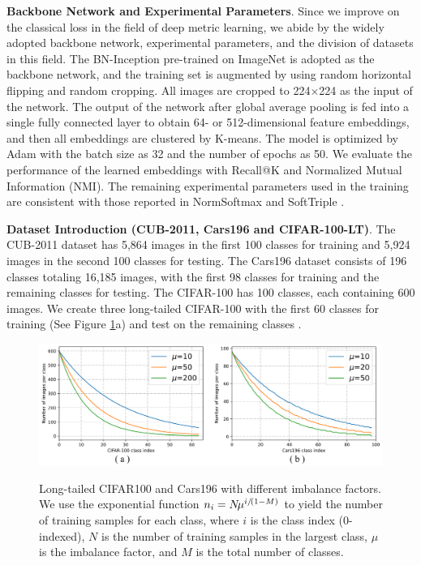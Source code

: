 \documentclass[10pt]{article} %
\begin{document}
\textbf{Backbone Network and Experimental Parameters}. Since we improve on the classical loss in the field of deep metric learning, we abide by the widely adopted backbone network, experimental parameters, and the division of datasets in this field. The BN-Inception \cite{paper38,paper78} pre-trained on ImageNet is adopted as the backbone network, and the training set is augmented by using random horizontal flipping and random cropping. All images are cropped to 224$\times$224 as the input of the network. The output of the network after global average pooling is fed into a single fully connected layer to obtain 64- or 512-dimensional feature embeddings, and then all embeddings are clustered by K-means. The model is optimized by Adam with the batch size as 32 and the number of epochs as 50. We evaluate the performance of the learned embeddings with Recall@K and Normalized Mutual Information (NMI). The remaining experimental parameters used in the training are consistent with those reported in NormSoftmax and SoftTriple \cite{paper82}.



\textbf{Dataset Introduction (CUB-2011, Cars196 and CIFAR-100-LT)}. The CUB-2011 dataset has 5,864 images in the first 100 classes for training and 5,924 images in the second 100 classes for testing. The Cars196 dataset consists of 196 classes totaling 16,185 images, with the first 98 classes for training and the remaining classes for testing. The CIFAR-100 has 100 classes, each containing 600 images. We create three long-tailed CIFAR-100 with the first 60 classes for training (See Figure \ref{fig6}a) and test on the remaining classes \cite{paper82}. 


\begin{figure}[h] %
\begin{center}
\includegraphics[width=0.95\columnwidth]{fig6}
\vskip -0.05in
\caption{Long-tailed CIFAR100 and Cars196 with different imbalance factors. We use the exponential function ${n_i} = N\!{\mu ^{{i \mathord{/
 {\vphantom {i {( {1 - M} )}}} 
 \kern-\nulldelimiterspace} {( {1 - M} )}}}}$ to yield the number of training samples for each class, where $i$ is the class index (0-indexed), $N$ is the number of training samples in the largest class, $\mu$ is the imbalance factor, and $M$ is the total number of classes.}
\vskip -0.2in
\label{fig6}
\end{center}
\end{figure}
\end{document}
